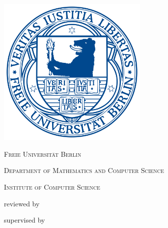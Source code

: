 
\thispagestyle{empty}
\hypersetup{pageanchor=false}
\begin{titlepage}
	\centering
	\vspace{2cm}
	{\textbf{\@subject}}
	\vspace{0.5cm}

	{\textbf{\huge \@title}}
    
	{\large \@author}
	\vspace{0.5cm}

	\includegraphics[width=0.55\textwidth]{images/2000px-Fub_siegel.png}

	{\scshape\LARGE Freie Universität Berlin}
    
	{\scshape\large Department of Mathematics and Computer Science}
    
	\vspace{-0.4cm}
	{\scshape\large Institute of Computer Science}
	\vspace{0.5cm}

	reviewed by
    
    \vspace{-0.4cm}
    \myreviewer

	supervised by
    
    \vspace{-0.4cm}
	\mysupervisor
	\vfill

	{\large \@date}

\hypersetup{pageanchor=true}
\end{titlepage}
